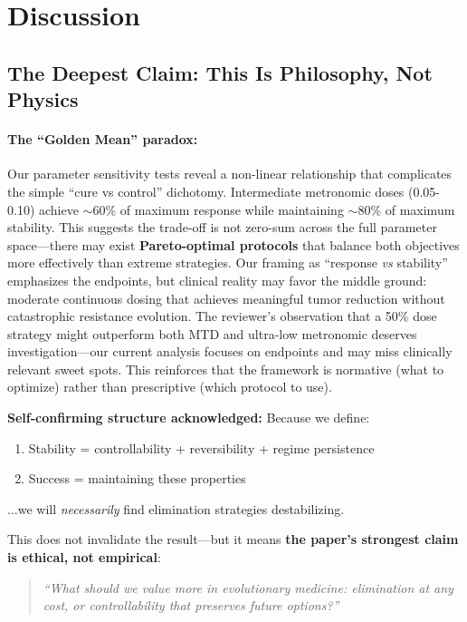 \documentclass[11pt,a4paper]{article}
\begin{document}
\section{Discussion}

\subsection{The Deepest Claim: This Is Philosophy, Not Physics}

\paragraph{The ``Golden Mean'' paradox:} Our parameter sensitivity tests reveal a non-linear relationship that complicates the simple ``cure vs control'' dichotomy. Intermediate metronomic doses (0.05-0.10) achieve $\sim$60\% of maximum response while maintaining $\sim$80\% of maximum stability. This suggests the trade-off is not zero-sum across the full parameter space---there may exist \textbf{Pareto-optimal protocols} that balance both objectives more effectively than extreme strategies. Our framing as ``response \textit{vs} stability'' emphasizes the endpoints, but clinical reality may favor the middle ground: moderate continuous dosing that achieves meaningful tumor reduction without catastrophic resistance evolution. The reviewer's observation that a 50\% dose strategy might outperform both MTD and ultra-low metronomic deserves investigation---our current analysis focuses on endpoints and may miss clinically relevant sweet spots. This reinforces that the framework is normative (what to optimize) rather than prescriptive (which protocol to use).

\textbf{Self-confirming structure acknowledged:} Because we define:
\begin{enumerate}
    \item Stability = controllability + reversibility + regime persistence
    \item Success = maintaining these properties
\end{enumerate}
...we will \textit{necessarily} find elimination strategies destabilizing.

This does not invalidate the result---but it means \textbf{the paper's strongest claim is ethical, not empirical}:

\begin{quote}
\textit{``What should we value more in evolutionary medicine: elimination at any cost, or controllability that preserves future options?''}
\end{quote}
\end{document}
